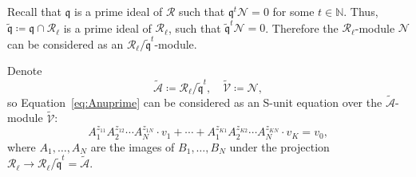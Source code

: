 \documentclass[letterpaper, 11pt, thm-restate]{article}
\numberwithin{equation}{section}
\newcommand{\N}{\mathbb{N}}
\newcommand{\mN}{\mathcal{N}}
\newcommand{\mR}{\mathcal{R}}
\newcommand{\tmA}{\widetilde{\mathcal{A}}}
\newcommand{\tmV}{\widetilde{\mathcal{V}}}
\newcommand{\frp}{\mathfrak{p}}
\newcommand{\tfrq}{\widetilde{\mathfrak{q}}}
\newcommand{\frq}{\mathfrak{q}}
\theoremstyle{definition}
\theoremstyle{definition}
\theoremstyle{definition}
\begin{document}

Recall that $\frq$ is a prime ideal of $\mR$ such that $\frq^t \mN = 0$ for some $t \in \N$. 
Thus, $\tfrq \coloneqq \frq \cap \mR_{\ell}$ is a prime ideal of $\mR_{\ell}$, such that $\tfrq^t \mN = 0$. 
Therefore the $\mR_{\ell}$-module $\mN$ can be considered as an $\mR_{\ell}/\tfrq^t$-module.

Denote
\[
\tmA \coloneqq \mR_{\ell}/\tfrq^t, \quad \tmV \coloneqq \mN,
\]
so Equation~\eqref{eq:Anuprime} can be considered as an S-unit equation over the $\tmA$-module $\tmV$:
\begin{equation}\label{eq:Anuvarphi}
A_1^{z_{11}} A_2^{z_{12}} \cdots A_N^{z_{1N}} \cdot v_1 + \cdots + A_1^{z_{K1}} A_2^{z_{K2}} \cdots A_N^{z_{KN}} \cdot v_K = v_0,
\end{equation}
where $A_1, \ldots, A_N$ are the images of $B_1, \ldots, B_N$ under the projection $\mR_{\ell} \rightarrow \mR_{\ell}/\tfrq^t = \tmA$.
\end{document}
